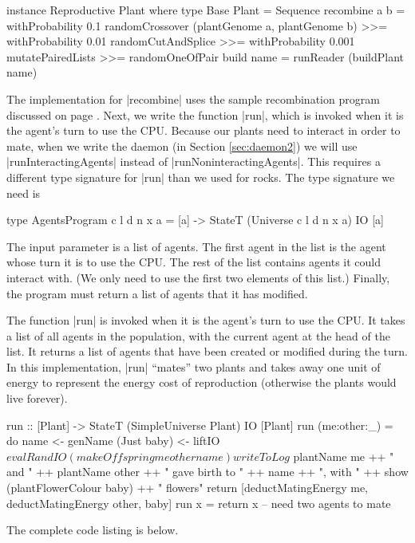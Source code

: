 \begin{code}
instance Reproductive Plant where
  type Base Plant = Sequence
  recombine a b = 
    withProbability 0.1 randomCrossover (plantGenome a, plantGenome b) >>=
    withProbability 0.01 randomCutAndSplice >>=
    withProbability 0.001 mutatePairedLists >>=
    randomOneOfPair
  build name = runReader (buildPlant name)
\end{code} 

The implementation for |recombine| uses the sample recombination
program discussed on page \pageref{code:recombination}.
Next, we write the function |run|, 
which is invoked when it is the agent's turn to use the CPU.
Because our plants need to interact in order to mate,
when we write the daemon (in Section \ref{sec:daemon2}) we will use
|runInteractingAgents| instead of |runNoninteractingAgents|.
This requires a different type signature for |run| than we used for
rocks.
The type signature we need is

\begin{code}
type AgentsProgram c l d n x a = 
  [a] -> StateT (Universe c l d n x a) IO [a]
\end{code} 

The input parameter is a list of agents. 
The first agent in the list is the agent whose turn it is to use the 
CPU.
The rest of the list contains agents it could interact with.
(We only need to use the first two elements of this list.)
Finally, the program must return a list of agents that it has modified.

The function |run| is invoked when it is the agent's turn to use the CPU.
It takes a list of all agents in the population, with the current agent at the head of the list.
It returns a list of agents that have been created or modified during the turn.
In this implementation, |run| ``mates'' two plants and takes away one unit of energy 
to represent the energy cost of reproduction
(otherwise the plants would live forever).

\begin{code}
run :: [Plant] -> StateT (SimpleUniverse Plant) IO [Plant]
run (me:other:_) = do
  name <- genName
  (Just baby) <- liftIO $ evalRandIO (makeOffspring me other name)
  writeToLog $ 
    plantName me ++ " and " ++ plantName other ++
      " gave birth to " ++ name ++ ", with " ++ 
       show (plantFlowerColour baby) ++ " flowers"
  return [deductMatingEnergy me, deductMatingEnergy other, baby]
run x = return x -- need two agents to mate
\end{code}

The complete code listing is below.
\label{code:plant}


